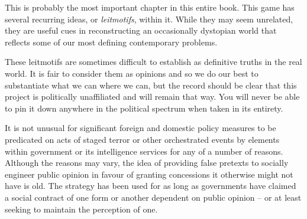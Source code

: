 

This is probably the most important chapter in this entire book. This game has several recurring ideas, or {\it leitmotifs}, within it. While they may seem unrelated, they are useful cues in reconstructing an occasionally dystopian world that reflects some of our most defining contemporary problems. 

These leitmotifs are sometimes difficult to establish as definitive truths in the real world. It is fair to consider them as opinions and so we do our best to substantiate what we can where we can, but the record should be clear that this project is politically unaffiliated and will remain that way. You will never be able to pin it down anywhere in the political spectrum when taken in its entirety.

\startitemize[4]

It is not unusual for significant foreign and domestic policy measures to be predicated on acts of staged terror or other orchestrated events by elements within government or its intelligence services for any of a number of reasons. Although the reasons may vary, the idea of providing false pretexts to socially engineer public opinion in favour of granting concessions it otherwise might not have is old. The strategy has been used for as long as governments have claimed a social contract of one form or another dependent on public opinion -- or at least seeking to maintain the perception of one.

